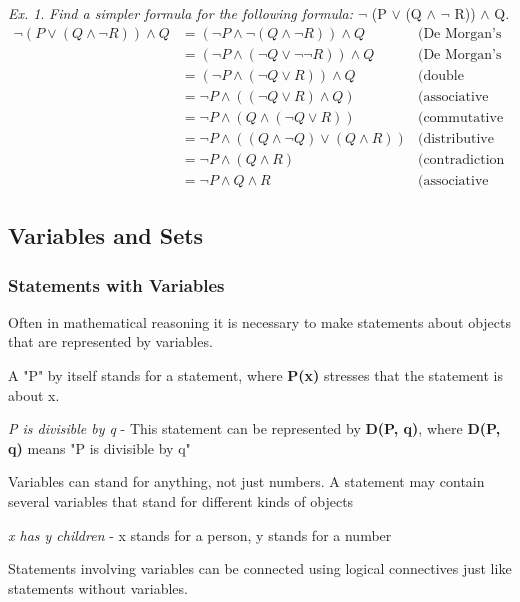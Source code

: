 \documentclass[11pt]{article}
\theoremstyle{definition}
\theoremstyle{remark}
\newtheorem{exer}{Ex.}
\begin{document}
\newpage
\begin{exer}
\textit{Find a simpler formula for the following formula:} $\neg$ (P $\lor$ (Q $\land$ $\neg$ R)) $\land$ Q.
\newline
\begin{align*}
\neg (P \lor (Q \land \neg R)) \land Q & = (\neg P \land \neg (Q \land \neg R)) \land Q & \text{(De Morgan's law)} \\
& = (\neg P \land (\neg Q \lor \neg \neg R)) \land Q & \text{(De Morgan's Law)}\\
& = (\neg P \land (\neg Q \lor R)) \land Q & \text{(double negation law)} \\
& = \neg P \land ((\neg Q \lor R) \land Q) & \text{(associative law)} \\
& = \neg P \land (Q \land (\neg Q \lor R)) & \text{(commutative law)} \\
& = \neg P \land ((Q \land \neg Q) \lor (Q \land R)) & \text{(distributive law)} \\
& = \neg P \land (Q \land R) & \text{(contradiction law)} \\
& = \neg P \land Q \land R & \text{(associative law)}
\end{align*}
\end{exer} 


\subsection{Variables and Sets}
\subsubsection{Statements with Variables}
Often in mathematical reasoning it is necessary to make statements about objects that are represented by variables.


A "P" by itself stands for a statement, where \textbf{P(x)} stresses that the statement is about x.


\textit{P is divisible by q} - This statement can be represented by \textbf{D(P, q)}, where \textbf{D(P, q)} means "P is divisible by q"


Variables can stand for anything, not just numbers. A statement may contain several variables that stand for different kinds of objects

\textit{x has y children} - x stands for a person, y stands for a number

Statements involving variables can be connected using logical connectives just like statements without variables.
\end{document}
